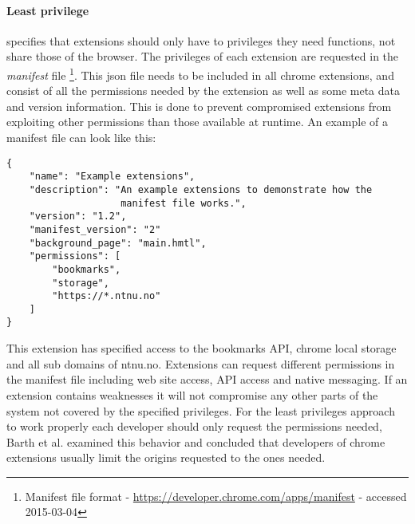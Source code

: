 \paragraph{Least privilege} specifies that extensions should only have to privileges they need functions, not share those of the browser. The privileges of each extension are requested in the \emph{manifest} file \footnote{Manifest file format - \url{https://developer.chrome.com/apps/manifest} - accessed 2015-03-04}. This json file needs to be included in all chrome extensions, and consist of all the permissions needed by the extension as well as some meta data and version information. This is done to prevent compromised extensions from exploiting other permissions than those available at runtime. An example of a manifest file can look like this: 

\begin{verbatim}
{
    "name": "Example extensions",
    "description": "An example extensions to demonstrate how the
                    manifest file works.",
    "version": "1.2",
    "manifest_version": "2"
    "background_page": "main.hmtl",
    "permissions": [
        "bookmarks",
        "storage",
        "https://*.ntnu.no"
    ]
}
\end{verbatim}
This extension has specified access to the bookmarks API, chrome local storage and all sub domains of ntnu.no. Extensions can request different permissions in the manifest file including web site access, API access and native messaging. If an extension contains weaknesses it will not compromise any other parts of the system not covered by the specified privileges. For the least privileges approach to work properly each developer should only request the permissions needed, Barth et al. \cite{protecting-browsers} examined this behavior and concluded that developers of chrome extensions usually limit the origins requested to the ones needed. 

